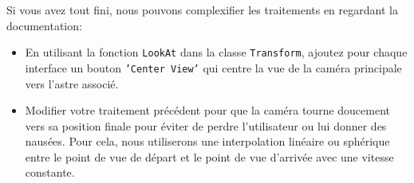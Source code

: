 \documentclass[a4paper,10pt]{article}
\begin{document}
Si vous avez tout fini, nous pouvons complexifier les traitements en regardant la documentation:
\begin{itemize}
	\item En utilisant la fonction \texttt{LookAt} dans la classe \texttt{Transform}, ajoutez pour chaque interface un bouton \texttt{'Center View'} qui centre la vue de la caméra principale vers l'astre associé.
	\item Modifier votre traitement précédent pour que la caméra tourne doucement vers sa position finale pour éviter de perdre l'utilisateur ou lui donner des nausées. Pour cela, nous utiliserons une interpolation linéaire ou sphérique  entre le point de vue de départ et le point de vue d'arrivée avec une vitesse constante.
\end{itemize}

\ifversionenseignant
\end{document}
